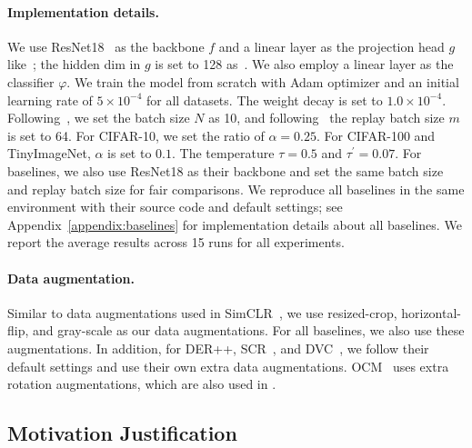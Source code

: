 \paragraph{Implementation details.}
We use ResNet18~\cite{ResNet} as the backbone $f$ and a linear layer as the projection head $g$ like~\cite{SCR, OCM, Co2L}; the hidden dim in $g$ is set to 128 as~\cite{SimCLR}. We also employ a linear layer as the classifier $\varphi$. We train the model from scratch with Adam optimizer and an initial learning rate of $5\times10^{-4}$ for all datasets. The weight decay is set to $1.0\times10^{-4}$. Following~\cite{ASER, DVC}, we set the batch size $N$ as 10, and following~\cite{OCM} the replay batch size $m$ is set to 64. 
For CIFAR-10, we set the ratio of \dataaugname $\alpha = 0.25$. For CIFAR-100 and TinyImageNet, $\alpha$ is set to $0.1$. The temperature $\tau = 0.5$ and $\tau^{\prime} = 0.07$.
For baselines, we also use ResNet18 as their backbone and set the same batch size and replay batch size for fair comparisons.
We reproduce all baselines in the same environment with their source code and default settings; see Appendix~\ref{appendix:baselines} for implementation details about all baselines.
We report the average results across 15 runs for all experiments.



\paragraph{Data augmentation.}
Similar to data augmentations used in SimCLR~\cite{SimCLR}, we use resized-crop, horizontal-flip, and gray-scale as our data augmentations. For all baselines, we also use these augmentations. In addition, for DER++\cite{DER++}, SCR~\cite{SCR}, and DVC~\cite{DVC}, we follow their default settings and use their own extra data augmentations. OCM~\cite{OCM} uses extra rotation augmentations, which are also used in \frameworkName.


\subsection{Motivation Justification}
\label{pre_exp}
